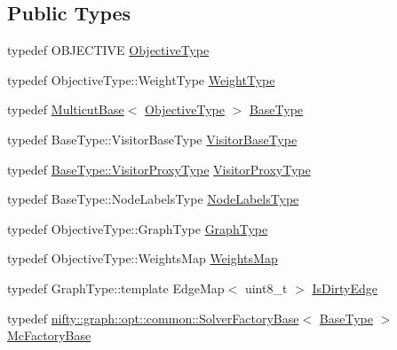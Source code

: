 \subsection*{Public Types}
\begin{DoxyCompactItemize}
\item 
typedef O\+B\+J\+E\+C\+T\+I\+VE \hyperlink{classnifty_1_1graph_1_1opt_1_1multicut_1_1ChainedSolvers_a4d9fa96d1a27a875c036b01bf547c1d0}{Objective\+Type}
\item 
typedef Objective\+Type\+::\+Weight\+Type \hyperlink{classnifty_1_1graph_1_1opt_1_1multicut_1_1ChainedSolvers_a86f9f19f6bbbbf630356873573f39a02}{Weight\+Type}
\item 
typedef \hyperlink{classnifty_1_1graph_1_1opt_1_1multicut_1_1MulticutBase}{Multicut\+Base}$<$ \hyperlink{classnifty_1_1graph_1_1opt_1_1multicut_1_1ChainedSolvers_a4d9fa96d1a27a875c036b01bf547c1d0}{Objective\+Type} $>$ \hyperlink{classnifty_1_1graph_1_1opt_1_1multicut_1_1ChainedSolvers_a77e11f6353ef773b9570eb302158bc12}{Base\+Type}
\item 
typedef Base\+Type\+::\+Visitor\+Base\+Type \hyperlink{classnifty_1_1graph_1_1opt_1_1multicut_1_1ChainedSolvers_a2023073333edc978eca4a4fb8d06ae1b}{Visitor\+Base\+Type}
\item 
typedef \hyperlink{classnifty_1_1graph_1_1opt_1_1common_1_1SolverBase_ad209b469b3bc9fc0fc14e9fed4d09075}{Base\+Type\+::\+Visitor\+Proxy\+Type} \hyperlink{classnifty_1_1graph_1_1opt_1_1multicut_1_1ChainedSolvers_ab39284cac6a5643faf84dcc32c84ddc5}{Visitor\+Proxy\+Type}
\item 
typedef Base\+Type\+::\+Node\+Labels\+Type \hyperlink{classnifty_1_1graph_1_1opt_1_1multicut_1_1ChainedSolvers_a44d5163a198e88948d9301370c2aead5}{Node\+Labels\+Type}
\item 
typedef Objective\+Type\+::\+Graph\+Type \hyperlink{classnifty_1_1graph_1_1opt_1_1multicut_1_1ChainedSolvers_aed99a8b8eb707145f933b36e3a71ad8b}{Graph\+Type}
\item 
typedef Objective\+Type\+::\+Weights\+Map \hyperlink{classnifty_1_1graph_1_1opt_1_1multicut_1_1ChainedSolvers_a0537810b1e7da59cf3ea803ddab4afef}{Weights\+Map}
\item 
typedef Graph\+Type\+::template Edge\+Map$<$ uint8\+\_\+t $>$ \hyperlink{classnifty_1_1graph_1_1opt_1_1multicut_1_1ChainedSolvers_a23dbba4746efaf4919d2d40bb2baaea2}{Is\+Dirty\+Edge}
\item 
typedef \hyperlink{classnifty_1_1graph_1_1opt_1_1common_1_1SolverFactoryBase}{nifty\+::graph\+::opt\+::common\+::\+Solver\+Factory\+Base}$<$ \hyperlink{classnifty_1_1graph_1_1opt_1_1multicut_1_1ChainedSolvers_a77e11f6353ef773b9570eb302158bc12}{Base\+Type} $>$ \hyperlink{classnifty_1_1graph_1_1opt_1_1multicut_1_1ChainedSolvers_acb272f072d6f09a3a6f136fe2ee31068}{Mc\+Factory\+Base}
\end{DoxyCompactItemize}
